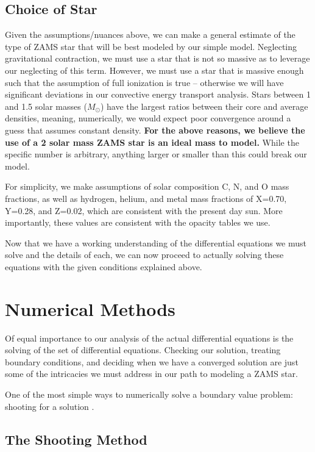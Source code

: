 \documentclass[twocolumn]{aastex631}
\begin{document}
\subsection{Choice of Star}

Given the assumptions/nuances above, we can make a general estimate of the type of ZAMS star that will be best modeled by our simple model. Neglecting gravitational contraction, we must use a star that is not so massive as to leverage our neglecting of this term. However, we must use a star that is massive enough such that the assumption of full ionization is true -- otherwise we will have significant deviations in our convective energy transport analysis. Stars between 1 and 1.5 solar masses ($M_\odot$) have the largest ratios between their core and average densities, meaning, numerically, we would expect poor convergence around a guess that assumes constant density. \textbf{For the above reasons, we believe the use of a 2 solar mass ZAMS star is an ideal mass to model.} While the specific number is arbitrary, anything larger or smaller than this could break our model.

For simplicity, we make assumptions of solar composition C, N, and O mass fractions, as well as hydrogen, helium, and metal mass fractions of X=0.70, Y=0.28, and Z=0.02, which are consistent with the present day sun. More importantly, these values are consistent with the opacity tables we use.

Now that we have a working understanding of the differential equations we must solve and the details of each, we can now proceed to actually solving these equations with the given conditions explained above.


\section{Numerical Methods}

Of equal importance to our analysis of the actual differential equations is the solving of the set of differential equations. Checking our solution, treating boundary conditions, and deciding when we have a converged solution are just some of the intricacies we must address in our path to modeling a ZAMS star. 

One of the most simple ways to numerically solve a boundary value problem: shooting for a solution \citep{numrec}.

\subsection{The Shooting Method}
\end{document}
